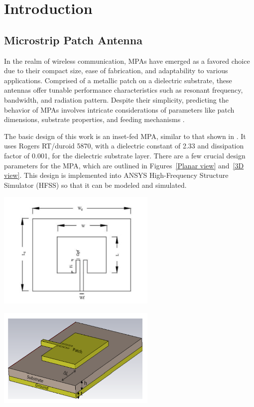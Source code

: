 \documentclass[conference]{IEEEtran}
\newenvironment{Figure}
    {\par\medskip\noindent\minipage{\linewidth}}
    {\endminipage\par\medskip}
\begin{document}
\section{Introduction}
\subsection{Microstrip Patch Antenna}
In the realm of wireless communication, MPAs have emerged as a favored choice due to their compact size, ease of fabrication, and adaptability to various applications. Comprised of a metallic patch on a dielectric substrate, these antennas offer tunable performance characteristics such as resonant frequency, bandwidth, and radiation pattern. Despite their simplicity, predicting the behavior of MPAs involves intricate considerations of parameters like patch dimensions, substrate properties, and feeding mechanisms \cite{Patch_antennas}.

The basic design of this work is an inset-fed MPA, similar to that shown in \cite{inset_feed_pa}. It uses Rogers RT/duroid 5870, with a dielectric constant of 2.33 and dissipation factor of 0.001, for the dielectric substrate layer. There are a few crucial design parameters for the MPA, which are outlined in Figures~\ref{Planar view} and~\ref{3D view}. This design is implemented into ANSYS High-Frequency Structure Simulator (HFSS) so that it can be modeled and simulated. 

\begin{Figure}
    \centering
    \includegraphics[width=3in]{inset_fed patch antenna.png}
    \label{Planar view}
\end{Figure}


\begin{Figure}
    \centering
    \includegraphics[width=3in]{3D patch antenna.png}
    \label{3D view}
\end{Figure}
\end{document}
